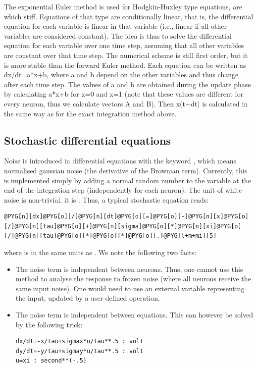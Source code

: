 \documentclass[letterpaper,10pt,english]{manual}
\begin{document}
The exponential Euler method is used for Hodgkin-Huxley type
equations, are which stiff.
Equations of that type are conditionally linear, that is, the differential equation
for each variable is linear in that variable (i.e., linear if all other variables
are considered constant).
The idea is thus to solve the differential equation for each variable over one time step,
assuming that all other variables are constant over that time step. The numerical scheme
is still first order, but it is more stable than the forward Euler method.
Each equation can be written as dx/dt=a*x+b, where a and b depend on the other variables
and thus change after each time step.
The values of a and b are obtained during the update phase by calculating a*x+b for x=0 and x=1
(note that these values are different for every neuron, thus we calculate vectors A and B).
Then x(t+dt) is calculated in the same way as for the exact integration method above.

\subsection{Stochastic differential equations}

Noise is introduced in differential equations with the keyword
, which means normalised gaussian noise (the derivative of the Brownian term).
Currently, this is implemented simply by adding a normal random number to the variable
at the end of the integration step (independently for each neuron).
The unit of white noise is non-trivial, it is . Thus, a typical stochastic
equation reads:

\begin{Verbatim}[commandchars=@\[\]]
@PYG[n][dx]@PYG[o][/]@PYG[n][dt]@PYG[o][=]@PYG[o][-]@PYG[n][x]@PYG[o][/]@PYG[n][tau]@PYG[o][+]@PYG[n][sigma]@PYG[o][*]@PYG[n][xi]@PYG[o][/]@PYG[n][tau]@PYG[o][*]@PYG[o][*]@PYG[o][.]@PYG[l+m+mi][5]
\end{Verbatim}

where  is in the same units as . We note the following two facts:
\begin{itemize}
\item {} 
The noise term is independent between neurons. Thus, one cannot use this method to analyse
the response to frozen noise (where all neurons receive the same input noise). One would need
to use an external variable representing the input, updated by a user-defined operation.

\item {} 
The noise term is independent between equations. This can however be solved by the following
trick:

\begin{Verbatim}[commandchars=@\[\]]
dx/dt=-x/tau+sigmax*u/tau**.5 : volt
dy/dt=-y/tau+sigmay*u/tau**.5 : volt
u=xi : second**(-.5)
\end{Verbatim}

\end{itemize}
\end{document}

